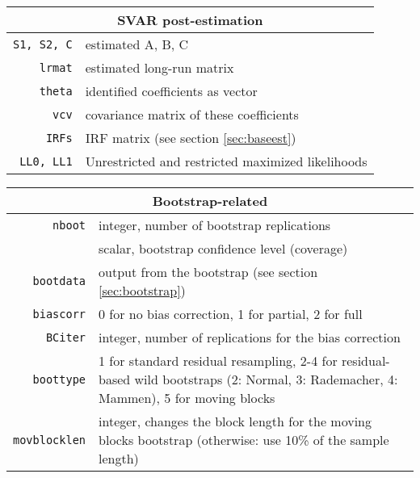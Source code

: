 \documentclass[a4paper,10pt]{article}
\newcommand{\dtk}[1]{\texttt{\detokenize{#1}}}
\begin{document}
    \begin{tabular}{rp{}}
    \hline
    \multicolumn{2}{c}{\textbf{SVAR post-estimation}} \\
    \hline
    \texttt{S1, S2, C} & estimated A, B, C \\
    \texttt{lrmat} & estimated long-run matrix \\ 
    \texttt{theta} & identified coefficients as vector \\
    \texttt{vcv} & covariance matrix of these coefficients \\
    \texttt{IRFs}  & IRF matrix (see section \ref{sec:baseest})\\
    \texttt{LL0, LL1} & Unrestricted and restricted maximized likelihoods \\
     \end{tabular}
    
    \begin{tabular}{rp{}}
    \hline
    \multicolumn{2}{c}{\textbf{Bootstrap-related}} \\
    \hline
    \texttt{nboot}	 & integer, number of bootstrap replications \\
    \dtk{boot_alpha} & scalar, bootstrap confidence level (coverage)\\
    \texttt{bootdata}	 & output from the bootstrap (see section \ref{sec:bootstrap})\\
    \texttt{biascorr}	 & 0 for no bias correction, 1 for
    partial, 2 for full\\
    \texttt{BCiter} & integer, number of replications for the bias correction \\
    \texttt{boottype}   & 1 for standard residual resampling, 2-4 for residual-based 
    wild bootstraps (2: Normal, 3: Rademacher, 4: Mammen), 5 for moving blocks \\
    \texttt{movblocklen} & integer, changes the block length for the moving blocks bootstrap
      (otherwise: use 10\% of the sample length)
     \end{tabular}
     
\end{document}

